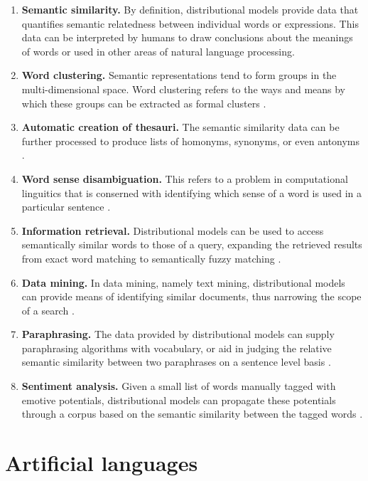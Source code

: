 \documentclass[14pt, a4paper]{extreport}
\begin{document}
\begin{enumerate}
  \item \textbf{Semantic similarity.} By definition, distributional models provide data that quantifies semantic relatedness between individual words or expressions. This data can be interpreted by humans to draw conclusions about the meanings of words or used in other areas of natural language processing.
  \item \textbf{Word clustering.} Semantic representations tend to form groups in the multi-dimensional space. Word clustering refers to the ways and means by which these groups can be extracted as formal clusters \parencite{bekkerman}.
  \item \textbf{Automatic creation of thesauri.} The semantic similarity data can be further processed to produce lists of homonyms, synonyms, or even antonyms \parencite{henestroza}.
  \item \textbf{Word sense disambiguation.} This refers to a problem in computational linguitics that is conserned with identifying which sense of a word is used in a particular sentence \parencite{musto}.
  \item \textbf{Information retrieval.} Distributional models can be used to access semantically similar words to those of a query, expanding the retrieved results from exact word matching to semantically fuzzy matching \parencite{silva}.
  \item \textbf{Data mining.} In data mining, namely text mining, distributional models can provide means of identifying similar documents, thus narrowing the scope of a search \parencite[89]{dalianis}.
  \item \textbf{Paraphrasing.} The data provided by distributional models can supply paraphrasing algorithms with vocabulary, or aid in judging the relative semantic similarity between two paraphrases on a sentence level basis \parencite{desouki}.
  \item \textbf{Sentiment analysis.} Given a small list of words manually tagged with emotive potentials, distributional models can propagate these potentials through a corpus based on the semantic similarity between the tagged words \parencite{alshari}.
\end{enumerate}


\section{Artificial languages}

\end{document}
